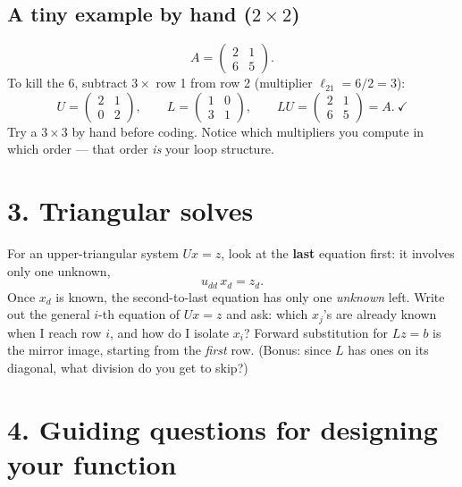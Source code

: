 \documentclass[11pt]{article}
\begin{document}
\subsection*{A tiny example by hand ($2\times 2$)}
\[
  A=\begin{pmatrix} 2 & 1\\ 6 & 5\end{pmatrix}.
\]
To kill the $6$, subtract $3\times$ row 1 from row 2 (multiplier
$\ell_{21}=6/2=3$):
\[
  U=\begin{pmatrix} 2 & 1\\ 0 & 2\end{pmatrix},\qquad
  L=\begin{pmatrix} 1 & 0\\ 3 & 1\end{pmatrix},\qquad
  LU=\begin{pmatrix} 2 & 1\\ 6 & 5\end{pmatrix}=A.\ \checkmark
\]
Try a $3\times 3$ by hand before coding. Notice which multipliers you
compute in which order --- that order \emph{is} your loop structure.

\section*{3. Triangular solves}

For an upper-triangular system $Ux=z$, look at the \textbf{last}
equation first: it involves only one unknown,
\[
  u_{dd}\,x_d = z_d .
\]
Once $x_d$ is known, the second-to-last equation has only one
\emph{unknown} left. Write out the general $i$-th equation of $Ux=z$ and
ask: which $x_j$'s are already known when I reach row $i$, and how do I
isolate $x_i$? Forward substitution for $Lz=b$ is the mirror image,
starting from the \emph{first} row. (Bonus: since $L$ has ones on its
diagonal, what division do you get to skip?)

\section*{4. Guiding questions for designing your function}
\end{document}
